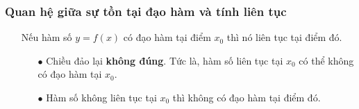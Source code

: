 \subsubsection{Quan hệ giữa sự tồn tại đạo hàm và tính liên tục}
\begin{itemize}
	\item [\iconMT]  Nếu hàm số  $y=f(x)$  có đạo hàm tại điểm $x_0$   thì nó liên tục tại điểm đó.
	\item [\iconMT] 
	\begin{gachsoc}
		\begin{itemize}
			\item [$\bullet$] Chiều đảo lại \textbf{không đúng}. Tức là, hàm số liên tục tại $x_0$ có thể không có đạo hàm tại $x_0$.
			\item [$\bullet$] Hàm số không liên tục tại $x_0$ thì không có đạo hàm tại điểm đó.
		\end{itemize}
	\end{gachsoc}
\end{itemize}

